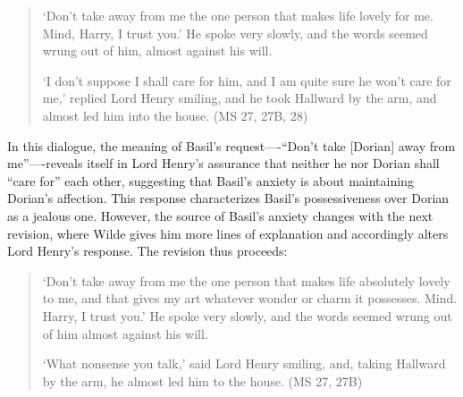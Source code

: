 \documentclass[11pt]{article}
\begin{document}
\begin{quote}
‘Don’t take away from me the one person that makes life lovely for
me. Mind, Harry, I trust you.’ He spoke very slowly, and the words
seemed wrung out of him, almost against his will.

‘I don’t suppose I shall care for him, and I am quite sure he won’t
care for me,’ replied Lord Henry smiling, and he took Hallward by the
arm, and almost led him into the house. (MS 27, 27B, 28)
\end{quote}

In this dialogue, the meaning of Basil’s request—-“Don’t take [Dorian]
away from me”—-reveals itself in Lord Henry’s assurance that neither
he nor Dorian shall “care for” each other, suggesting that Basil’s
anxiety is about maintaining Dorian’s affection. This response
characterizes Basil’s possessiveness over Dorian as a jealous
one. However, the source of Basil’s anxiety changes with the next
revision, where Wilde gives him more lines of explanation and
accordingly alters Lord Henry’s response. The revision thus proceeds:

\begin{quote}
‘Don’t take away from me the one person that makes life absolutely
lovely to me, and that gives my art whatever wonder or charm it
possesses. Mind. Harry, I trust you.’ He spoke very slowly, and the
words seemed wrung out of him almost against his will.

‘What nonsense you talk,’ said Lord Henry smiling, and, taking
Hallward by the arm, he almost led him to the house. (MS 27, 27B)
\end{quote}
\end{document}
